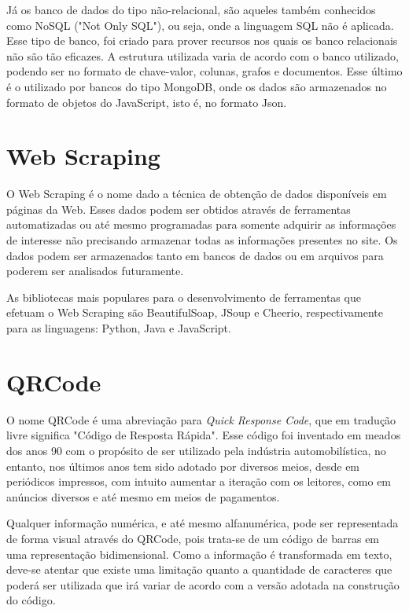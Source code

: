 Já os banco de dados do tipo não-relacional, são aqueles também conhecidos como NoSQL ("Not Only SQL"), ou seja, onde a linguagem SQL não é aplicada. Esse tipo de banco, foi criado para prover recursos nos quais os banco relacionais não são tão eficazes. A estrutura utilizada varia de acordo com o banco utilizado, podendo ser no formato de chave-valor, colunas, grafos e documentos. Esse último é o utilizado por bancos do tipo MongoDB, onde os dados são armazenados no formato de objetos do JavaScript, isto é, no formato Json.

\section{Web Scraping}

O Web Scraping é o nome dado a técnica de obtenção de dados disponíveis em páginas da Web. Esses dados podem ser obtidos através de ferramentas automatizadas ou até mesmo programadas para somente adquirir as informações de interesse não precisando armazenar todas as informações presentes no site.
Os dados podem ser armazenados tanto em bancos de dados ou em arquivos para poderem ser analisados futuramente.

As bibliotecas mais populares para o desenvolvimento de ferramentas que efetuam o Web Scraping são BeautifulSoap, JSoup e Cheerio, respectivamente para as linguagens: Python, Java e JavaScript.

\section{QRCode}

O nome QRCode é uma abreviação para \textit{Quick Response Code}, que em tradução livre significa "Código de Resposta Rápida". Esse código foi inventado em meados dos anos 90 com o propósito de ser utilizado pela indústria automobilística, no entanto, nos últimos anos tem sido adotado por diversos meios, desde em periódicos impressos, com intuito aumentar a iteração com os leitores, como em anúncios diversos e até mesmo em meios de pagamentos.

Qualquer informação numérica, e até mesmo alfanumérica, pode ser representada de forma visual através do QRCode, pois trata-se de um código de barras em uma representação bidimensional. Como a informação é transformada em texto, deve-se atentar que existe uma limitação quanto a quantidade de caracteres que poderá ser utilizada que irá variar de acordo com a versão adotada na construção do código.

